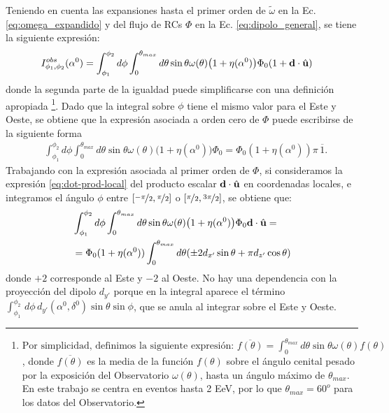     Teniendo en cuenta las expansiones hasta el primer orden de $\tilde{\omega}$ en la Ec.\ref{eq:omega_expandido} y del flujo de RCs $\Phi$ en la Ec. \ref{eq:dipolo_general}, se tiene la siguiente expresión:
    \begin{align}
        I_{\phi_1, \phi_2}^{obs}(\alpha^0) &= \int_{\phi_1}^{\phi_2} d\phi \int_{0}^{\theta_{max}} d\theta  \sin\theta \omega(\theta)\big(1 + \eta(\alpha^0) \big) \Phi_0 ( 1 +  \textbf{d}\cdot\hat{\bf{u}}) \label{eq:I-obs}
    \end{align}
    donde la segunda parte  de la igualdad  puede simplificarse con una definición apropiada  \footnote{ $
        \text{Por simplicidad, definimos la siguiente expresión: }
      \overline{f(\theta)} = \int_{0}^{\theta_{max}} d\theta \sin\theta \omega(\theta) f(\theta)
      \label{eq:media_angular}
  $
  \noindent, donde $\overline{f(\theta)}$ es la media de la función $f(\theta)$ sobre el ángulo cenital pesado por la exposición del Observatorio $\omega(\theta)$, hasta  un ángulo máximo de $\theta_{max}$. En este trabajo se centra en eventos hasta 2 EeV, por lo que $\theta_{max}=60^o$ para los datos del Observatorio.}. Dado que la integral sobre $\phi$ tiene el mismo valor para el Este y Oeste, se obtiene que la expresión asociada a orden cero de $\Phi$ puede escribirse de la siguiente forma
    \begin{align*}
        &\int_{\phi_1}^{\phi_2} d\phi \int_{0}^{\theta_{max}} d\theta \sin\theta \omega(\theta)\big(1 + \eta(\alpha^0) \big) \Phi_0 
        = \Phi_0 (1+ \eta(\alpha^0)) \pi\,\overline{1}. 
    \end{align*}
    Trabajando con la expresión asociada al primer orden de $\Phi$, si consideramos la expresión \ref{eq:dot-prod-local} del producto escalar $\textbf{d}\cdot\hat{\bf{u}}$ en coordenadas locales, e integramos el ángulo  $\phi$ entre $[\nicefrac{-\pi}{2}, \nicefrac{\pi}{2}]$ o $[\nicefrac{\pi}{2}, \nicefrac{3\pi}{2}]$, se obtiene que:
    \begin{align}
        &\int_{\phi_1}^{\phi_2} d\phi \int_{0}^{\theta_{max}} d\theta \sin\theta \omega(\theta)\big(1 + \eta(\alpha^0) \big) \Phi_0 \textbf{d}\cdot\hat{\bf{u}}=\\
        &=\Phi_0 (1+ \eta(\alpha^0)) \int_{0}^{\theta_{max}}  d\theta (\pm 2d_{x'}\sin\theta 
        + \pi d_{z'}\cos\theta) \label{segundo_term}
    \end{align}
    \noindent donde $+2$ corresponde al Este y $-2$ al Oeste. No hay una dependencia con la proyección del dipolo $d_{y'}$ porque en la integral aparece el término $\int_{\phi_1}^{\phi_2}\, d\phi\, d_{y'}(\alpha^0, \delta^0) \sin\theta \sin\phi $, que se anula al integrar sobre el Este y Oeste.

